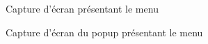 \begin{figure}[H]
    \label{fig-menu}
    \noindent{}
    \caption{Capture d'écran présentant le menu}
\end{figure}

\begin{figure}[H]
    \label{fig-menu-popup}
    \noindent{}
    \caption{Capture d'écran du popup présentant le menu}
\end{figure}

